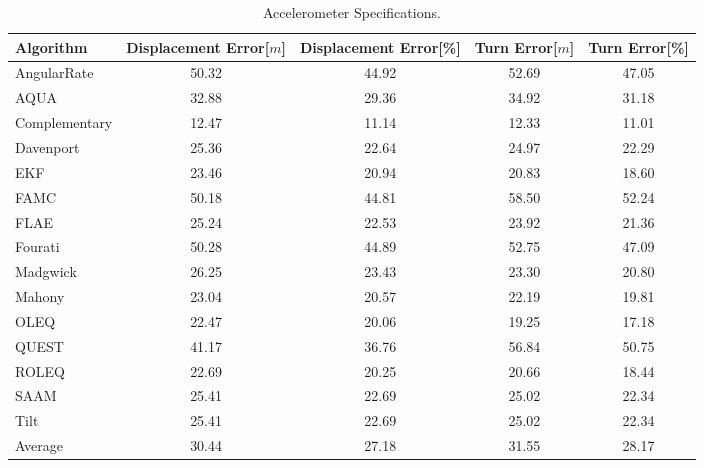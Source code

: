\begin{table}[H]
    \begin{center}
        \begin{tabular}[t]{lcccc}
            \hline
            Algorithm                   & Displacement Error[$m$] & Displacement Error[\%]      & Turn Error[$m$]  & Turn Error[\%]             \\
            \hline 
            AngularRate            & 50.32  & 44.92 & 52.69 & 47.05              \\            AQUA            & 32.88  & 29.36 & 34.92 & 31.18              \\            Complementary            & 12.47  & 11.14 & 12.33 & 11.01              \\            Davenport            & 25.36  & 22.64 & 24.97 & 22.29              \\            EKF            & 23.46  & 20.94 & 20.83 & 18.60              \\            FAMC            & 50.18  & 44.81 & 58.50 & 52.24              \\            FLAE            & 25.24  & 22.53 & 23.92 & 21.36              \\            Fourati            & 50.28  & 44.89 & 52.75 & 47.09              \\            Madgwick            & 26.25  & 23.43 & 23.30 & 20.80              \\            Mahony            & 23.04  & 20.57 & 22.19 & 19.81              \\            OLEQ            & 22.47  & 20.06 & 19.25 & 17.18              \\            QUEST            & 41.17  & 36.76 & 56.84 & 50.75              \\            ROLEQ            & 22.69  & 20.25 & 20.66 & 18.44              \\            SAAM            & 25.41  & 22.69 & 25.02 & 22.34              \\            Tilt            & 25.41  & 22.69 & 25.02 & 22.34              \\
            \hline
            Average & 30.44 & 27.18 & 31.55 & 28.17
        \end{tabular}
        \caption{Accelerometer Specifications. }
        \label{tab:accelerometer_specification}
    \end{center}
\end{table}